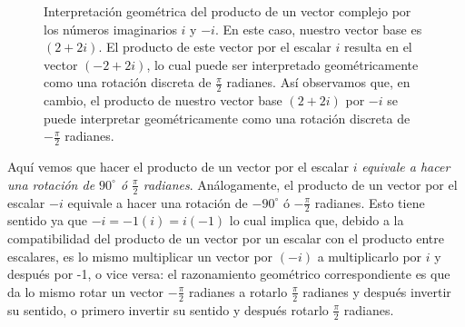 \documentclass[notasLineal]{subfiles}
\begin{document}
\begin{figure}[h!]
    \centering
    \caption{Interpretación geométrica del producto de un vector complejo por los números imaginarios $i$ y $-i$. En este caso, nuestro vector base es $(2+2i)$. El producto de este vector por el escalar $i$ resulta en el vector $(-2+2i)$, lo cual puede ser interpretado geométricamente como una rotación discreta de $\frac{\pi}{2}$ radianes. Así observamos que, en cambio, el producto de nuestro vector base $(2+2i)$ por $-i$ se puede interpretar geométricamente como una rotación discreta de $-\frac{\pi}{2}$ radianes.}
    \label{fig:Producto_de_un_vector_complejo_por_i}
\end{figure}

   Aquí vemos que hacer el producto de un vector por el escalar $i$ \emph{equivale a hacer una rotación de $90^\circ$ ó $\frac{\pi}{2}$ radianes}. Análogamente, el producto de un vector por el escalar $-i$ equivale a hacer una rotación de $-90^\circ$ ó $-\frac{\pi}{2}$ radianes. Esto tiene sentido ya que $-i=-1(i)=i(-1)$ lo cual implica que, debido a la compatibilidad del producto de un vector por un escalar con el producto entre escalares, es lo mismo multiplicar un vector por $(-i)$ a multiplicarlo por $i$ y después por -1, o vice versa: el razonamiento geométrico correspondiente es que da lo mismo rotar un vector $-\frac{\pi}{2}$ radianes a rotarlo $\frac{\pi}{2}$ radianes y después invertir su sentido, o primero invertir su sentido y después rotarlo $\frac{\pi}{2}$ radianes. \\
\end{document}

